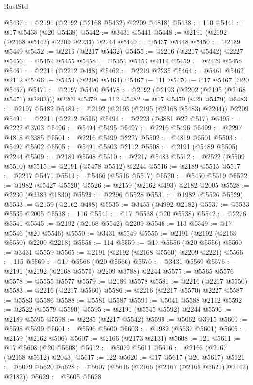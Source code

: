 \begin{lexlean}{RustStd}
\begin{coremodule}
@5437 := @2191 (@2192 (@2168 @5432) @2209 @4818)
@5438 := 110
@5441 := @17 @5438 (@20 @5438)
@5442 := @3431 @5441
@5448 := @2191 (@2192 (@2168 @5442) @2209 @2233) @2244
@5449 := @5437 @5448
@5450 := @2189 @5449
@5452 := @2216 (@2217 @5432)
@5455 := @2216 (@2217 @5442) @2227
@5456 := @5452 @5455
@5458 := @5351 @5456 @2112
@5459 := @2429 @5458
@5461 := @2211 (@2212 @498)
@5462 := @2219 @2235
@5464 := @5461 @5462 @2112
@5466 := @5459 (@2296 @5464)
@5467 := 111
@5470 := @17 @5467 (@20 @5467)
@5471 := @2197 @5470
@5478 := @2192 (@2193 (@2202 (@2195 (@2168 @5471) @2203))) @2209
@5479 := 112
@5482 := @17 @5479 (@20 @5479)
@5483 := @2197 @5482
@5489 := @2192 (@2193 (@2195 (@2168 @5483) @2204)) @2209
@5491 := @2211 (@2212 @506)
@5494 := @2223 (@3881 @22 @517)
@5495 := @2222 @3703
@5496 := @5494 @5495
@5497 := @2216 @5496
@5499 := @2297 @4818 @3385
@5501 := @2216 @5499 @2227
@5502 := @4819 @5501
@5503 := @5497 @5502
@5505 := @5491 @5503 @2112
@5508 := @2191 (@5489 @5505) @2244
@5509 := @2189 @5508
@5510 := @2217 @5483
@5512 := @2522 (@5509 @5510)
@5515 := @2191 (@5478 @5512) @2244
@5516 := @2189 @5515
@5517 := @2217 @5471
@5519 := @5466 (@5516 @5517)
@5520 := @5450 @5519
@5522 := @1982 (@5427 @5520)
@5526 := @2159 (@2162 @493) @2182 @2005
@5528 := @2230 (@3383 @1830)
@5529 := @2296 @5528
@5531 := @1982 (@5526 @5529)
@5533 := @2159 (@2162 @498)
@5535 := @3455 (@4992 @2182)
@5537 := @5533 @5535 @2005
@5538 := 116
@5541 := @17 @5538 (@20 @5538)
@5542 := @2276 @5541
@5545 := @2192 (@2168 @5542) @2209
@5546 := 113
@5549 := @17 @5546 (@20 @5546)
@5550 := @3431 @5549
@5555 := @2191 (@2192 (@2168 @5550) @2209 @2218)
@5556 := 114
@5559 := @17 @5556 (@20 @5556)
@5560 := @3431 @5559
@5565 := @2191 (@2192 (@2168 @5560) @2209 @2221)
@5566 := 115
@5569 := @17 @5566 (@20 @5566)
@5570 := @3431 @5569
@5576 := @2191 (@2192 (@2168 @5570) @2209 @3788) @2244
@5577 := @5565 @5576
@5578 := @5555 @5577
@5579 := @2189 @5578
@5581 := @2216 (@2217 @5550)
@5583 := @2216 (@2217 @5560)
@5586 := @2216 (@2217 @5570) @2227
@5587 := @5583 @5586
@5588 := @5581 @5587
@5590 := @5041 @5588 @2112
@5592 := @2522 (@5579 @5590)
@5595 := @2191 (@5545 @5592) @2244
@5596 := @2189 @5595
@5598 := @2285 (@2217 @5542)
@5599 := @5062 @3915
@5600 := @5598 @5599
@5601 := @5596 @5600
@5603 := @1982 (@5537 @5601)
@5605 := @2159 (@2162 @506)
@5607 := @2166 (@2173 @2131)
@5608 := 121
@5611 := @17 @5608 (@20 @5608)
@5612 := @5079 @5611
@5616 := @2166 (@2167 (@2168 @5612) @2043)
@5617 := 122
@5620 := @17 @5617 (@20 @5617)
@5621 := @5079 @5620
@5628 := @5607 (@5616 (@2166 (@2167 (@2168 @5621) @2142) @2182))
@5629 := @5605 @5628

\end{coremodule}
\end{lexlean}
